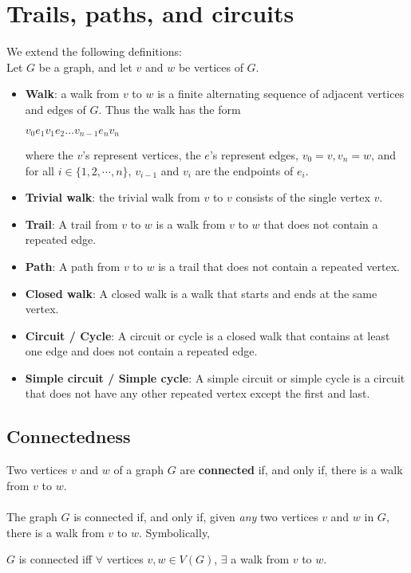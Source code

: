\documentclass[a4paper]{article}
\begin{document}
\section{Trails, paths, and circuits}
We extend the following definitions:\\
Let $G$ be a graph, and let $v$ and $w$ be vertices of $G$.
\begin{itemize}
	\item[] \textbf{Walk}: a walk from $v$ to $w$ is a finite alternating sequence of adjacent vertices and edges of $G$. Thus the walk has the form
	\begin{center}
		$v_0e_1v_1e_2\dots v_{n-1}e_nv_n$
	\end{center}
	where the $v$'s represent vertices, the $e$'s represent edges, $v_0=v, v_n=w$, and for all $i\in\{1,2,\dotsm,n\}$, $v_{i-1}$ and $v_i$ are the endpoints of $e_i$.
	\item[] \textbf{Trivial walk}: the trivial walk from $v$ to $v$ consists of the single vertex $v$.
	\item[] \textbf{Trail}: A trail from $v$ to $w$ is a walk from $v$ to $w$ that does not contain a repeated edge.
	\item[] \textbf{Path}: A path from $v$ to $w$ is a trail that does not contain a repeated vertex.
	\item[] \textbf{Closed walk}: A closed walk is a walk that starts and ends at the same vertex.
	\item[] \textbf{Circuit / Cycle}: A circuit or cycle is a closed walk that contains at least one edge and does not contain a repeated edge.
	\item[] \textbf{Simple circuit / Simple cycle}: A simple circuit or simple cycle is a circuit that does not have any other repeated vertex except the first and last.
\end{itemize}

\subsection{Connectedness}
Two vertices $v$ and $w$ of a graph $G$ are \textbf{connected} if, and only if, there is a walk from $v$ to $w$.\\\\
The graph $G$ is connected if, and only if, given \textit{any} two vertices $v$ and $w$ in $G$, there is a walk from $v$ to $w$. Symbolically,
\begin{center}
	$G$ is connected iff $\forall$ vertices $v,w\in V(G)$, $\exists$ a walk from $v$ to $w$.
\end{center}
\end{document}
